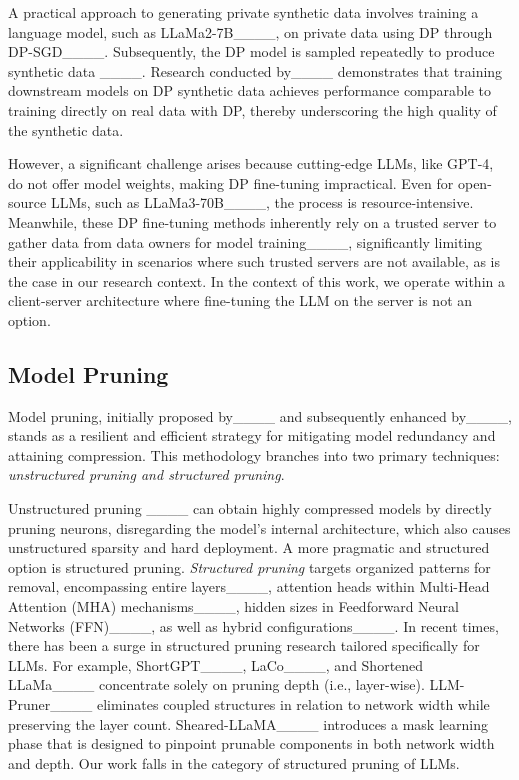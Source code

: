 A practical approach to generating private synthetic data involves training a language model, such as LLaMa2-7B____, on private data using DP through DP-SGD____. Subsequently, the DP model is sampled repeatedly to produce synthetic data ____. 
Research conducted by____ demonstrates that training downstream models on DP synthetic data achieves performance comparable to training directly on real data with DP, thereby underscoring the high quality of the synthetic data.

However, a significant challenge arises because cutting-edge LLMs, like GPT-4, do not offer model weights, making DP fine-tuning impractical. Even for open-source LLMs, such as LLaMa3-70B____, the process is resource-intensive. 
Meanwhile, these DP fine-tuning methods inherently rely on a trusted server to gather data from data owners for model training____, significantly limiting their applicability in scenarios where such trusted servers are not available, as is the case in our research context.
In the context of this work, we operate within a client-server architecture where fine-tuning the LLM on the server is not an option. 



\subsection{Model Pruning}

Model pruning, initially proposed by____ and subsequently enhanced by____, stands as a resilient and efficient strategy for mitigating model redundancy and attaining compression. This methodology branches into two primary techniques: \textit{unstructured pruning and structured pruning}.

Unstructured pruning ____ can obtain highly compressed models by directly pruning neurons, disregarding the model's internal architecture, which also causes unstructured sparsity and hard deployment.
A more pragmatic and structured option is structured pruning. \textit{Structured pruning} targets organized patterns for removal, encompassing entire layers____, attention heads within Multi-Head Attention (MHA) mechanisms____, hidden sizes in Feedforward Neural Networks (FFN)____, as well as hybrid configurations____. 
In recent times, there has been a surge in structured pruning research tailored specifically for LLMs. For example, ShortGPT____, LaCo____, and Shortened LLaMa____ concentrate solely on pruning depth (i.e., layer-wise). LLM-Pruner____ eliminates coupled structures in relation to network width while preserving the layer count. Sheared-LLaMA____ introduces a mask learning phase that is designed to pinpoint prunable components in both network width and depth.
Our work falls in the category of structured pruning of LLMs.